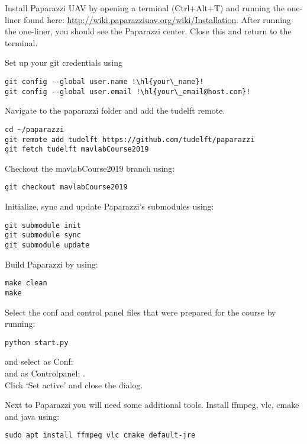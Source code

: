 \documentclass{article}
\begin{document}
\begin{enumerate}
\item{Install Paparazzi UAV by opening a terminal (Ctrl+Alt+T) and running the one-liner found here: \url{http://wiki.paparazziuav.org/wiki/Installation}. After running the one-liner, you should see the Paparazzi center. Close this and return to the terminal.}
\item{Set up your git credentials using
\begin{lstlisting}[style=Bash]
git config --global user.name !\hl{your\_name}!
git config --global user.email !\hl{your\_email@host.com}!
\end{lstlisting}}
\item{Navigate to the paparazzi folder and add the tudelft remote.
\begin{lstlisting}[style=Bash]
cd ~/paparazzi
git remote add tudelft https://github.com/tudelft/paparazzi
git fetch tudelft mavlabCourse2019
\end{lstlisting}
}
\item{Checkout the mavlabCourse2019 branch using:
\begin{lstlisting}[style=Bash]
git checkout mavlabCourse2019
\end{lstlisting}
}
\item{Initialize, sync and update Paparazzi's submodules using:
\begin{lstlisting}[style=Bash]
git submodule init
git submodule sync
git submodule update
\end{lstlisting}
}
\item{Build Paparazzi by using:
\begin{lstlisting}[style=Bash]
make clean
make
\end{lstlisting}
\item{Select the conf and control panel files that were prepared for the course by running:
\begin{lstlisting}[style=Bash]
python start.py
\end{lstlisting}
and select as Conf: \\
and as Controlpanel: .\\
Click `Set active' and close the dialog.}
\item{Next to Paparazzi you will need some additional tools. Install ffmpeg, vlc, cmake and java using:
\begin{lstlisting}[style=Bash]
sudo apt install ffmpeg vlc cmake default-jre
\end{lstlisting}
}}
\end{enumerate}
\end{document}
